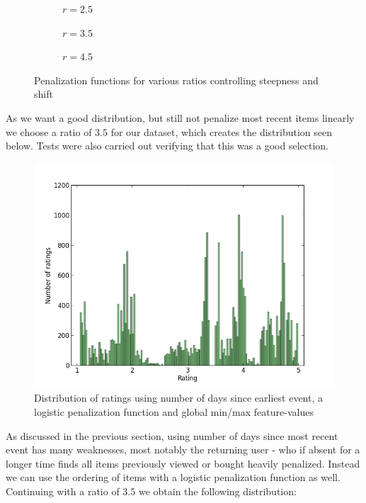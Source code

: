 \begin{figure}[H]
  \centering
  \begin{subfigure}[b]{0.3\textwidth}
    \caption{$r = 2.5$}
  \end{subfigure}
  \begin{subfigure}[b]{0.3\textwidth}
    \caption{$r = 3.5$}
  \end{subfigure}
  \begin{subfigure}[b]{0.3\textwidth}
    \caption{$r = 4.5$}
  \end{subfigure}
  \caption{Penalization functions for various ratios controlling steepness and
  shift}
  \label{fig:sigmoid-penalizations}
\end{figure}

As we want a good distribution, but still not penalize most recent items
linearly we choose a ratio of $3.5$ for our dataset, which creates the
distribution seen below. Tests were also carried out verifying that this was a
good selection.

\begin{figure}[H]
  \centering
  \includegraphics[scale=0.5]{image/dist-sigmoid-fixed-recentness-3-5}
  \caption{Distribution of ratings using number of days since earliest event,
  a logistic penalization function and global min/max feature-values}
  \label{fig:dist-recentness-sigmoid}
\end{figure}

As discussed in the previous section, using number of days since most recent
event has many weaknesses, most notably the returning user - who if absent for
a longer time finds all items previously viewed or bought heavily penalized.
Instead we can use the ordering of items with a logistic penalization function
as well. Continuing with a ratio of $3.5$ we obtain the following distribution:

